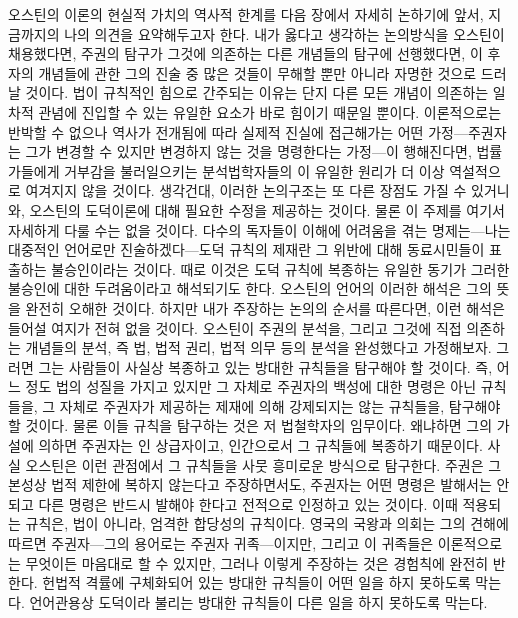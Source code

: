 오스틴의 이론의 현실적 가치의 역사적 한계를
다음 장에서 자세히 논하기에 앞서,
지금까지의 나의 의견을 요약해두고자 한다.
내가 옳다고 생각하는 논의방식을 오스틴이 채용했다면,
주권의 탐구가 그것에 의존하는 다른 개념들의 탐구에 선행했다면,
이 후자의 개념들에 관한 그의 진술 중 많은 것들이
무해할 뿐만 아니라 자명한 것으로 드러날 것이다.
법이 규칙적인 힘으로 간주되는 이유는 단지
다른 모든 개념이 의존하는 일차적 관념에 진입할 수 있는
유일한 요소가 바로 힘이기 때문일 뿐이다.
이론적으로는 반박할 수 없으나 역사가 전개됨에 따라 실제적 진실에 접근해가는
어떤 가정---주권자는 그가 변경할 수 있지만 변경하지 않는 것을
명령한다는 가정---이 행해진다면,
법률가들에게 거부감을 불러일으키는 분석법학자들의 이 유일한 원리가
더 이상 역설적으로 여겨지지 않을 것이다.
생각건대, 이러한 논의구조는 또 다른 장점도 가질 수 있거니와,
오스틴의 도덕이론에 대해 필요한 수정을 제공하는 것이다.
물론 이 주제를 여기서 자세하게 다룰 수는 없을 것이다.
다수의 독자들이 이해에 어려움을 겪는 명제는---나는 대중적인 언어로만
진술하겠다---도덕 규칙의 제재란 그 위반에 대해 동료시민들이 표출하는
불승인이라는 것이다.
때로 이것은 도덕 규칙에 복종하는 유일한 동기가 그러한 불승인에 대한
두려움이라고 해석되기도 한다.
오스틴의 언어의 이러한 해석은 그의 뜻을 완전히 오해한 것이다.
하지만 내가 주장하는 논의의 순서를 따른다면,
이런 해석은 들어설 여지가 전혀 없을 것이다.
오스틴이 주권의 분석을, 그리고 그것에 직접 의존하는 개념들의 분석,
즉 법, 법적 권리, 법적 의무 등의 분석을 완성했다고 가정해보자.
그러면 그는 사람들이 사실상 복종하고 있는 방대한 규칙들을 탐구해야 할 것이다.
즉, 어느 정도 법의 성질을 가지고 있지만
그 자체로 주권자의 백성에 대한 명령은 아닌 규칙들을,
그 자체로 주권자가 제공하는 제재에 의해 강제되지는 않는 규칙들을,
탐구해야 할 것이다.
물론 이들 규칙을 탐구하는 것은 저 법철학자의 임무이다.
왜냐하면 그의 가설에 의하면 주권자는
인 상급자이고, 인간으로서 그 규칙들에 복종하기 때문이다.
사실 오스틴은 이런 관점에서
그 규칙들을
사뭇 흥미로운 방식으로
탐구한다.
주권은 그 본성상 법적 제한에 복하지 않는다고 주장하면서도,
주권자는 어떤 명령은 발해서는 안 되고 다른 명령은 반드시 발해야 한다고
전적으로 인정하고 있는 것이다.
이때 적용되는 규칙은, 법이 아니라, 엄격한 합당성의 규칙이다.
영국의 국왕과 의회는
그의 견해에 따르면
주권자---그의 용어로는 주권자 귀족---이지만,
그리고
이 귀족들은 이론적으로는 무엇이든 마음대로 할 수 있지만,
그러나
이렇게 주장하는 것은 경험칙에 완전히 반한다.
헌법적 격률에 구체화되어 있는 방대한 규칙들이 어떤 일을 하지 못하도록 막는다.
언어관용상 도덕이라 불리는 방대한 규칙들이 다른 일을 하지 못하도록 막는다.
